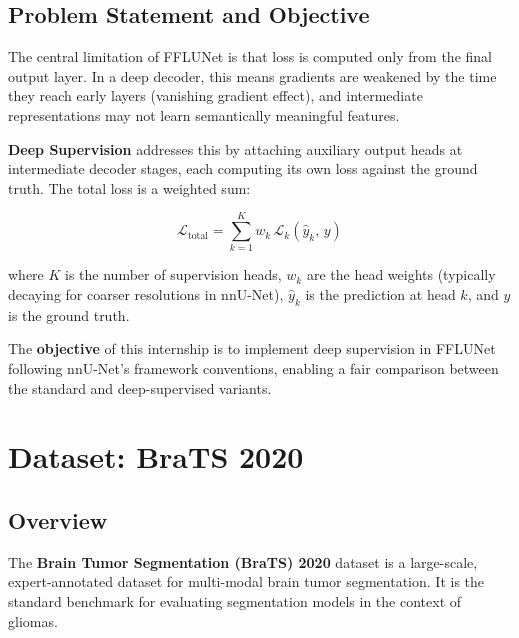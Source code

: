 \documentclass[12pt,a4paper]{report}
\begin{document}
\section{Problem Statement and Objective}

The central limitation of FFLUNet is that loss is computed only from the final output layer. In a deep decoder, this means gradients are weakened by the time they reach early layers (vanishing gradient effect), and intermediate representations may not learn semantically meaningful features.

\textbf{Deep Supervision} addresses this by attaching auxiliary output heads at intermediate decoder stages, each computing its own loss against the ground truth. The total loss is a weighted sum:

\begin{equation}
\mathcal{L}_{\text{total}} = \sum_{k=1}^{K} w_k \, \mathcal{L}_k(\hat{y}_k,\, y)
\label{eq:ds_loss}
\end{equation}

where $K$ is the number of supervision heads, $w_k$ are the head weights (typically decaying for coarser resolutions in nnU-Net), $\hat{y}_k$ is the prediction at head $k$, and $y$ is the ground truth.

The \textbf{objective} of this internship is to implement deep supervision in FFLUNet following nnU-Net's framework conventions, enabling a fair comparison between the standard and deep-supervised variants.

\chapter{Dataset: BraTS 2020}

\section{Overview}

The \textbf{Brain Tumor Segmentation (BraTS) 2020} dataset \cite{brats2020} is a large-scale, expert-annotated dataset for multi-modal brain tumor segmentation. It is the standard benchmark for evaluating segmentation models in the context of gliomas.
\end{document}
